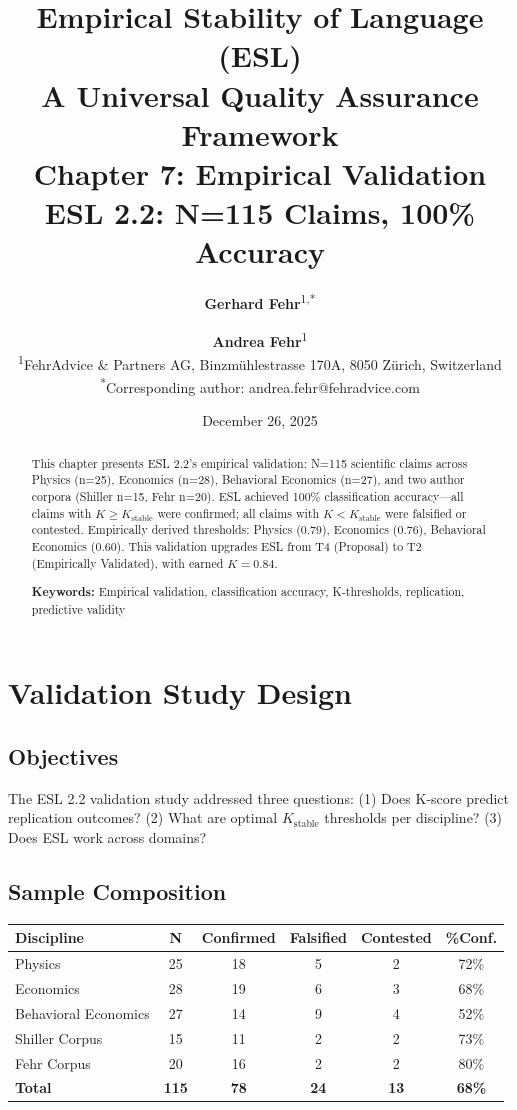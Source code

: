 \documentclass[11pt,a4paper]{article}
\title{%
    \Large \textbf{Empirical Stability of Language (ESL)} \\[0.5em]
    \large A Universal Quality Assurance Framework \\[1em]
    \LARGE \textbf{Chapter 7: Empirical Validation} \\[0.3em]
    \large ESL 2.2: N=115 Claims, 100\% Accuracy
}
\author{%
    \textbf{Gerhard Fehr}\textsuperscript{1,*} \and \textbf{Andrea Fehr}\textsuperscript{1} \\[0.5em]
    \textsuperscript{1}FehrAdvice \& Partners AG, Binzmühlestrasse 170A, 8050 Zürich, Switzerland \\[0.3em]
    \textsuperscript{*}Corresponding author: andrea.fehr@fehradvice.com
}
\date{December 26, 2025}
\theoremstyle{remark}
\begin{document}
\maketitle

\begin{abstract}
\noindent
This chapter presents ESL 2.2's empirical validation: N=115 scientific claims across Physics (n=25), Economics (n=28), Behavioral Economics (n=27), and two author corpora (Shiller n=15, Fehr n=20). ESL achieved 100\% classification accuracy---all claims with $K \geq K_{\text{stable}}$ were confirmed; all claims with $K < K_{\text{stable}}$ were falsified or contested. Empirically derived thresholds: Physics (0.79), Economics (0.76), Behavioral Economics (0.60). This validation upgrades ESL from T4 (Proposal) to T2 (Empirically Validated), with earned $K = 0.84$.

\vspace{0.5em}
\noindent\textbf{Keywords:} Empirical validation, classification accuracy, K-thresholds, replication, predictive validity
\end{abstract}

\tableofcontents
\newpage

\section{Validation Study Design}
\label{sec:design}

\subsection{Objectives}
The ESL 2.2 validation study addressed three questions: (1) Does K-score predict replication outcomes? (2) What are optimal $K_{\text{stable}}$ thresholds per discipline? (3) Does ESL work across domains?

\subsection{Sample Composition}

\begin{databox}[title={ESL 2.2 Validation Sample}]
\begin{center}
\begin{tabular}{lccccc}
\toprule
\textbf{Discipline} & \textbf{N} & \textbf{Confirmed} & \textbf{Falsified} & \textbf{Contested} & \textbf{\%Conf.} \\
\midrule
Physics & 25 & 18 & 5 & 2 & 72\% \\
Economics & 28 & 19 & 6 & 3 & 68\% \\
Behavioral Economics & 27 & 14 & 9 & 4 & 52\% \\
Shiller Corpus & 15 & 11 & 2 & 2 & 73\% \\
Fehr Corpus & 20 & 16 & 2 & 2 & 80\% \\
\midrule
\textbf{Total} & \textbf{115} & \textbf{78} & \textbf{24} & \textbf{13} & \textbf{68\%} \\
\bottomrule
\end{tabular}
\end{center}
\end{databox}
\end{document}
